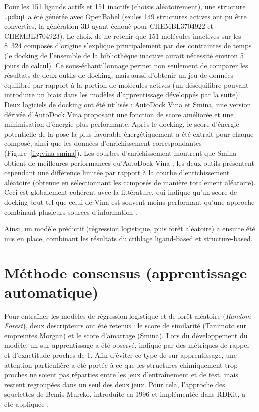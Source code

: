\documentclass{isddmaster}
\begin{document}
	Pour les 151 ligands actifs et 151 inactifs (choisis aléatoirement), une structure \lstinline{.pdbqt} a été générée avec OpenBabel (seules 149 structures actives ont pu être converties, la génération 3D ayant échoué pour CHEMBL3704922 et CHEMBL3704923). Le choix de ne retenir que 151 molécules inactives sur les 8~324 composés d'origine s'explique principalement par des contraintes de temps (le docking de l'ensemble de la bibliothèque inactive aurait nécessité environ 5 jours de calcul). Ce sous-échantillonnage permet non seulement de comparer les résultats de deux outils de docking, mais aussi d'obtenir un jeu de données équilibré par rapport à la portion de molécules actives (un déséquilibre pouvant introduire un biais dans les modèles d'apprentissage développés par la suite).
	Deux logiciels de docking ont été utilisés : AutoDock Vina et Smina, une version dérivée d'AutoDock Vina proposant une fonction de score améliorée et une minimisation d'énergie plus performante.
	Après le docking, le score d'énergie potentielle de la pose la plus favorable énergétiquement a été extrait pour chaque composé, ainsi que les données d'enrichissement correspondantes (Figure~\ref{fig:vina-smina}).
	Les courbes d'enrichissement montrent que Smina obtient de meilleures performances qu'AutoDock Vina ; les deux outils présentent cependant une différence limitée par rapport à la courbe d'enrichissement aléatoire (obtenue en sélectionnant les composés de manière totalement aléatoire).
	Ceci est globalement cohérent avec la littérature, qui indique qu'un score de docking brut tel que celui de Vina est souvent moins performant qu'une approche combinant plusieurs sources d'information \cite{Confidence}. %

	Ainsi, un modèle prédictif (régression logistique, puis forêt aléatoire) a ensuite été mis en place, combinant les résultats du criblage ligand-based et structure-based.
	
	\FloatBarrier
	\section{Méthode consensus (apprentissage automatique)}

	Pour entraîner les modèles de régression logistique et de forêt aléatoire (\textit{Random Forest}), deux descripteurs ont été retenus : le score de similarité (Tanimoto sur empreintes Morgan) et le score d'amarrage (Smina). Lors du développement du modèle, un sur-apprentissage a été observé, indiqué par des métriques de rappel et d'exactitude proches de 1.
	Afin d'éviter ce type de sur-apprentissage, une attention particulière a été portée à ce que les structures chimiquement trop proches ne soient pas réparties entre les jeux d'entraînement et de test, mais restent regroupées dans un seul des deux jeux.
	Pour cela, l'approche des squelettes de Bemis-Murcko, introduite en 1996 et implémentée dans RDKit, a été appliquée \cite{bemisPropertiesKnownDrugs1996,huLessonsLearnedMolecular2011}.
\end{document}
